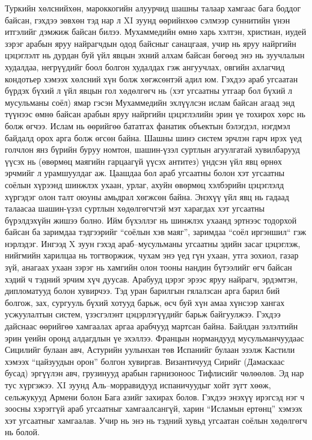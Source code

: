 Туркийн хөлснийхөн, мароккогийн алуурчид шашны талаар хамгаас бага боддог байсан, гэхдээ зөвхөн тэд нар л XI зуунд өөрийнхөө сэлмээр суннитийн үнэн итгэлийг дэмжиж байсан билээ. Мухаммедийн өмнө харь хэлтэн, христиан, иудей зэрэг арабын яруу найрагчдын одод байсныг санацгаая, учир нь яруу найргийн цэцэглэлт нь дурдан буй үйл явцын эхний алхам байсан бөгөөд энэ нь зуучлалын худалдаа, негрүүдийг боол болгон худалдах гэж ангуучлах, овгийн ахлагчид кондотьер хэмээх хөлсний хүн болж хөгжсөнтэй адил юм.
Гэхдээ араб угсаатан бүрдэх бүхий л үйл явцын гол хөдөлгөгч нь (хэт угсаатны утгаар бол бүхий л мусульманы соёл) ямар гэсэн Мухаммедийн эхлүүлсэн ислам байсан агаад энд түүнээс өмнө байсан арабын яруу найргийн цэцэглэлийн эрин үе тохирох хөрс нь болж өгчээ. Ислам нь өөрийгөө бататгах фанатик объектын бэлэгдэл, нэгдмэл байдалд орох арга болж өгсөн байна. Шашны шинэ систем эрчлэн гарч ирэх үед голчлон янз бүрийн буруу номтон, шашин-үзэл суртлын агуулгатай хувилбарууд үүсэх нь (өвөрмөц маягийн гарцаагүй үүсэх антитез) үндсэн үйл явц өрнөх эрчмийг л урамшуулдаг аж. Цаашдаа бол араб угсаатны болон хэт угсаатны соёлын хүрээнд шинжлэх ухаан, урлаг, ахуйн өвөрмөц хэлбэрийн цэцэглэлд хүргэдэг олон талт оюуны амьдрал хөгжсөн байна. Энэхүү үйл явц нь гадаад талаасаа шашин-үзэл суртлын хөдөлгөгчтэй мэт харагдах хэт угсаатны бүрэлдэхүйн жишээ болно. Ийм бүхэллэг нь шинжлэх ухаанд эртнээс тодорхой байсан ба заримдаа тэдгээрийг “соёлын хэв маяг”, заримдаа “соёл иргэншил“ гэж нэрлэдэг.
Ингээд X зуун гэхэд араб–мусульманы угсаатны эдийн засаг цэцэглэж, нийгмийн харилцаа нь тогтворжиж, чухам энэ үед гүн ухаан, утга зохиол, газар зүй, анагаах ухаан зэрэг нь хамгийн олон тооны нандин бүтээлийг өгч байсан хэдий ч тэдний эрчим хүч дуусав. Арабууд цэрэг эрээс яруу найрагч, эрдэмтэн, дипломатууд болон хувирчээ. Тэд уран барилгын гялалзсан арга барил бий болгож, зах, сургууль бүхий хотууд барьж, өсч буй хүн амаа хүнсээр хангах усжуулалтын систем, үзэсгэлэнт цэцэрлэгүүдийг барьж байгуулжээ. Гэхдээ дайснаас өөрийгөө хамгаалах аргаа арабчууд мартсан байна. Байлдан эзлэлтийн эрин үеийн оронд алдагдлын үе эхэллээ.
Францын нормандууд мусульманчуудаас Сицилийг булаан авч, Астурийн уулынхан төв Испанийг булаан эзэлж Кастили хэмээх “цайзуудын орон” болгон хувиргав. Византичууд Сирийг (Дамаскаас бусад) эргүүлэн авч, грузинууд арабын гарнизоноос Тифлисийг чөлөөлөв. Эд нар тус хүргэжээ. XI зуунд Аль–морравидууд испаничуудыг хойт зүгт хөөж, сельжукууд Армени болон Бага азийг захирах болов. Гэхдээ энэхүү ирэгсэд нэг ч зоосны хэрэггүй араб угсаатныг хамгаалсангүй, харин “Исламын ертөнц” хэмээх хэт угсаатныг хамгаалав. Учир нь энэ нь тэдний хувьд угсаатан соёлын хөдөлгөгч нь болой.
